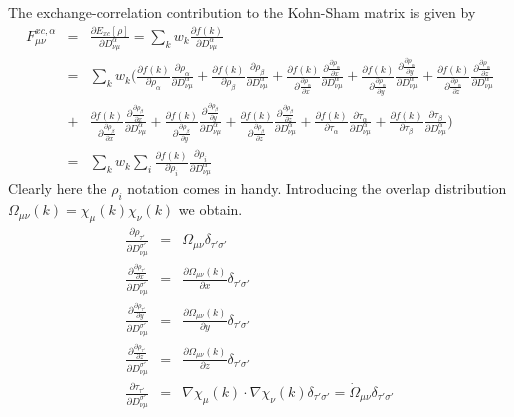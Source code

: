 \documentclass[preprint,preprintnumbers,amsmath,amssymb,11pt]{revtex4}
\begin{document}
The exchange-correlation contribution to the Kohn-Sham matrix is given by
\begin{eqnarray}
F^{xc,\alpha}_{\mu \nu} &=& \frac{\partial E_{xc}[\rho]}{\partial D^{\alpha}_{\nu \mu}} = 
\sum_{k} w_{k} \frac{\partial f(k)}{\partial D^{\alpha}_{\nu \mu}}\\
&=& \sum_{k} w_{k} \biggl( \frac{\partial f(k)}{\partial \rho_{\alpha}} \frac{\partial \rho_{\alpha}}{\partial D^{\alpha}_{\nu \mu}}
+ \frac{\partial f(k)}{\partial \rho_{\beta}} \frac{\partial \rho_{\beta}}{\partial D^{\alpha}_{\nu \mu}}
+ \frac{\partial f(k)}{\partial \frac{\partial \rho_{\alpha}}{\partial x}} \frac{\partial \frac{\partial \rho_{\alpha}}{\partial x}}{\partial D^{\alpha}_{\nu \mu}}
+ \frac{\partial f(k)}{\partial \frac{\partial \rho_{\alpha}}{\partial y}} \frac{\partial \frac{\partial \rho_{\alpha}}{\partial y}}{\partial D^{\alpha}_{\nu \mu}}
+ \frac{\partial f(k)}{\partial \frac{\partial \rho_{\alpha}}{\partial z}} \frac{\partial \frac{\partial \rho_{\alpha}}{\partial z}}{\partial D^{\alpha}_{\nu \mu}}\\
&+& \frac{\partial f(k)}{\partial \frac{\partial \rho_{\beta}}{\partial x}} \frac{\partial \frac{\partial \rho_{\beta}}{\partial x}}{\partial D^{\alpha}_{\nu \mu}}
+ \frac{\partial f(k)}{\partial \frac{\partial \rho_{\beta}}{\partial y}} \frac{\partial \frac{\partial \rho_{\beta}}{\partial y}}{\partial D^{\alpha}_{\nu \mu}}
+ \frac{\partial f(k)}{\partial \frac{\partial \rho_{\beta}}{\partial z}} \frac{\partial \frac{\partial \rho_{\beta}}{\partial z}}{\partial D^{\alpha}_{\nu \mu}} +
\frac{\partial f(k)}{\partial \tau_{\alpha}} \frac{\partial \tau_{\alpha}}{\partial D^{\alpha}_{\nu \mu}}
+ \frac{\partial f(k)}{\partial \tau_{\beta}} \frac{\partial \tau_{\beta}}{\partial D^{\alpha}_{\nu \mu}}
\biggr)\\
 &=& \sum_{k} w_{k} \sum_{i} \frac{\partial f(k)}{\partial \rho_{i}} \frac{\partial \rho_{i}}{\partial D^{\alpha}_{\nu \mu}}
\end{eqnarray}
Clearly here the $\rho_{i}$ notation comes in handy. Introducing the overlap distribution $\Omega_{\mu \nu}(k) = \chi_{\mu}(k) \chi_{\nu}(k)$ we obtain. 
\begin{eqnarray}\label{derivativestausigma}
\frac{\partial \rho_{\tau'}}{\partial D^{\sigma'}_{\nu \mu}} &=& \Omega_{\mu \nu}\delta_{\tau' \sigma'}\\
\frac{\partial \frac{\partial \rho_{\tau'}}{\partial x}}{\partial D^{\sigma'}_{\nu \mu}} &=& \frac{\partial \Omega_{\mu \nu}(k)}{\partial x}\delta_{\tau' \sigma'}\\
\frac{\partial \frac{\partial \rho_{\tau'}}{\partial y}}{\partial D^{\sigma'}_{\nu \mu}} &=& \frac{\partial \Omega_{\mu \nu}(k)}{\partial y}\delta_{\tau' \sigma'}\\
\frac{\partial \frac{\partial \rho_{\tau'}}{\partial z}}{\partial D^{\sigma'}_{\nu \mu}} &=& \frac{\partial \Omega_{\mu \nu}(k)}{\partial z}\delta_{\tau' \sigma'}\\
\frac{\partial \tau_{\tau'}}{\partial D^{\sigma'}_{\nu \mu}} &=& \nabla \chi_{\mu}(k) \cdot \nabla \chi_{\nu}(k) \delta_{\tau' \sigma'} = \dot{\Omega}_{\mu \nu}\delta_{\tau' \sigma'}
\end{eqnarray}
\end{document}
